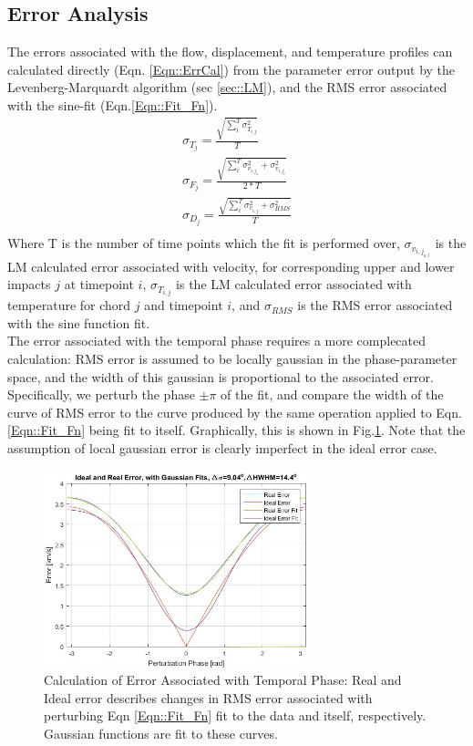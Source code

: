 \documentclass{AIAA}
\begin{document}
\subsection{Error Analysis}\label{sec:ErrorAnal}
\hspace*{4ex}The errors associated with the flow, displacement, and temperature profiles can calculated directly (Eqn. \ref{Eqn::ErrCal}) from the parameter error output by the Levenberg-Marquardt algorithm (sec \ref{sec::LM}), and the RMS error associated with the sine-fit (Eqn.\ref{Eqn::Fit_Fn}).
\begin{equation}\label{Eqn::ErrCal}
\begin{split}
\sigma_{T_j} = \frac{\sqrt{\sum_i^T\sigma_{T_{i,j}}^2}}{T}\\
\sigma_{F_j}=\frac{\sqrt{\sum_i^T\sigma_{v_{i,j_u}}^2+\sigma_{v_{i,j_l}}^2}}{2*T}\\
\sigma_{D_j}=\frac{\sqrt{\sum_i^T\sigma_{v_{i,j}}^2+\sigma_{RMS}^2}}{T}\\
\end{split}
\end{equation}
Where T is the number of time points which the fit is performed over, $\sigma_{v_{i,j_{u,l}}}$ is the LM calculated error associated with velocity, for corresponding upper and lower impacts $j$ at timepoint $i$, $\sigma_{T_{i,j}}$ is the LM calculated error associated with temperature for chord $j$ and timepoint $i$, and $\sigma_{RMS}$ is the RMS error associated with the sine function fit.\\
\hspace*{4ex}The error associated with the temporal phase requires a more complecated calculation: RMS error is assumed to be locally gaussian in the phase-parameter space, and the width of this gaussian is proportional to the associated error. Specifically, we perturb the phase $\pm\pi$ of the fit, and compare the width of the curve of RMS error to the curve produced by the same operation applied to Eqn.\ref{Eqn::Fit_Fn} being fit to itself. Graphically, this is shown in Fig.\ref{Fig::Phase Error}. Note that the assumption of local gaussian error is clearly imperfect in the ideal error case.
\begin{figure}
\includegraphics[width=3in]{PhaseFitError}\caption{Calculation of Error Associated with Temporal Phase: Real and Ideal error describes changes in RMS error associated with perturbing Eqn \ref{Eqn::Fit_Fn} fit to the data and itself, respectively. Gaussian functions are fit to these curves.}\label{Fig::Phase Error}
\end{figure}
\end{document}
